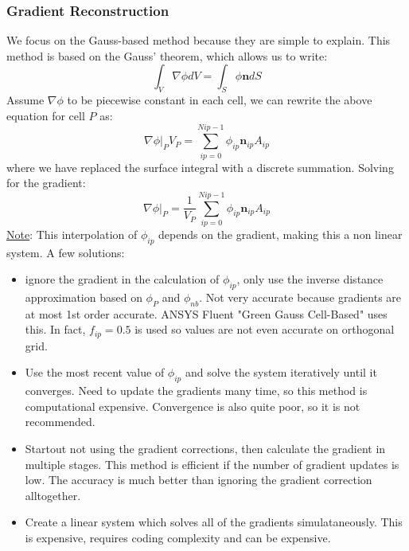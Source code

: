 \documentclass[11pt]{article}
\begin{document}
\subsubsection{Gradient Reconstruction}
\label{sec:org19fe6fa}
We focus on the Gauss-based method because they are simple to explain. This method is based on the Gauss'
theorem, which allows us to write:
\begin{equation*}
\int_{V} \nabla \phi dV = \int_{S} \phi \textbf{n} dS
\end{equation*}
Assume \(\nabla \phi\) to be piecewise constant in each cell, we can rewrite the above equation for cell
\(P\) as:
\begin{equation*}
\nabla \phi \biggr\rvert_P V_P = \sum_{ip=0}^{N{ip}-1} \phi_{ip}\textbf{n}_{ip}A_{ip}
\end{equation*}
where we have replaced the surface integral with a discrete summation. Solving for the gradient:
\begin{equation*}
\nabla \phi \biggr\rvert_P = \frac{1}{V_P}\sum_{ip=0}^{N{ip}-1} \phi_{ip}\textbf{n}_{ip}A_{ip}
\end{equation*}
\uline{Note}:
This interpolation of \(\phi_{ip}\) depends on the gradient, making this a non linear system.
A few solutions:
\begin{itemize}
\item ignore the gradient in the calculation of \(\phi_{ip}\), only use the inverse distance approximation
based on \(\phi_P\) and \(\phi_{nb}\). Not very accurate because gradients are at most 1st order
accurate. ANSYS Fluent "Green Gauss Cell-Based" uses this.  In fact, \(f_{ip} = 0.5\) is used so
values are not even accurate on orthogonal grid.
\item Use the most recent value of \(\phi_{ip}\) and solve the system iteratively until it converges. Need to
update the gradients many time, so this method is computational expensive. Convergence is also quite poor,
so it is not recommended.
\item Startout not using the gradient corrections, then calculate the gradient in multiple stages. This method
is efficient if the number of gradient updates is low. The accuracy is much better than ignoring the
gradient correction alltogether.
\item Create a linear system which solves all of the gradients simulataneously. This is expensive, requires
coding complexity and can be expensive.
\end{itemize}
\end{document}
